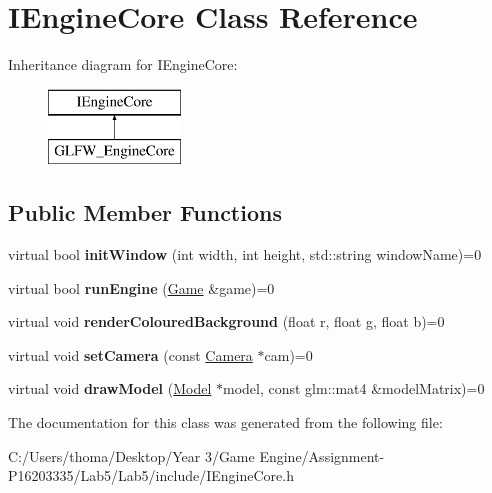 \hypertarget{class_i_engine_core}{}\section{I\+Engine\+Core Class Reference}
\label{class_i_engine_core}
Inheritance diagram for I\+Engine\+Core\+:\begin{figure}[H]
\begin{center}
\leavevmode
\includegraphics[height=2.000000cm]{class_i_engine_core}
\end{center}
\end{figure}
\subsection*{Public Member Functions}
\begin{DoxyCompactItemize}
\item 
\mbox{\label{class_i_engine_core_a27123704f8f24eefd9cb47aa9986cbf3}} 
virtual bool {\bfseries init\+Window} (int width, int height, std\+::string window\+Name)=0
\item 
\mbox{\label{class_i_engine_core_ad03940f571ec20ba7427feeca44ace21}} 
virtual bool {\bfseries run\+Engine} (\mbox{\hyperlink{class_game}{Game}} \&game)=0
\item 
\mbox{\label{class_i_engine_core_a8f8e0778f04c50b680cdde167cb38e2f}} 
virtual void {\bfseries render\+Coloured\+Background} (float r, float g, float b)=0
\item 
\mbox{\label{class_i_engine_core_ab2f643ce25708c87b20eecdcbb18b9ac}} 
virtual void {\bfseries set\+Camera} (const \mbox{\hyperlink{class_camera}{Camera}} $\ast$cam)=0
\item 
\mbox{\label{class_i_engine_core_a45f78f207ced5253b7323f4dcb637c2d}} 
virtual void {\bfseries draw\+Model} (\mbox{\hyperlink{class_model}{Model}} $\ast$model, const glm\+::mat4 \&model\+Matrix)=0
\end{DoxyCompactItemize}


The documentation for this class was generated from the following file\+:\begin{DoxyCompactItemize}
\item 
C\+:/\+Users/thoma/\+Desktop/\+Year 3/\+Game Engine/\+Assignment-\/\+P16203335/\+Lab5/\+Lab5/include/I\+Engine\+Core.\+h\end{DoxyCompactItemize}
